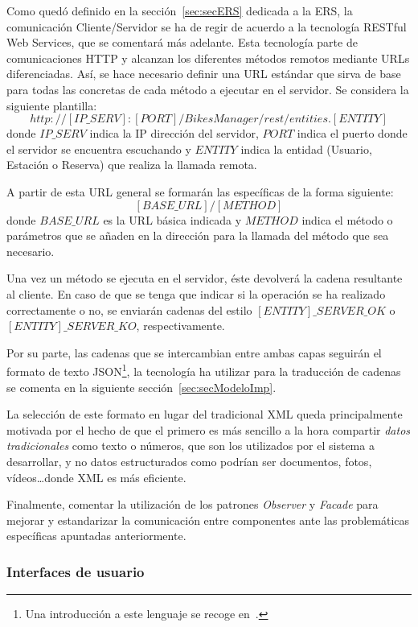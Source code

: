 Como quedó definido en la sección~\ref{sec:secERS} dedicada a la ERS, la comunicación Cliente/Servidor se ha de regir de acuerdo a la tecnología RESTful Web Services, que se comentará más adelante. Esta tecnología parte de comunicaciones HTTP y alcanzan los diferentes métodos remotos mediante URLs diferenciadas. Así, se hace necesario definir una URL estándar que sirva de base para todas las concretas de cada método a ejecutar en el servidor. Se considera la siguiente plantilla: $$http://[IP\_SERV]:[PORT]/BikesManager/rest/entities.[ENTITY]$$
donde $IP\_SERV$ indica la IP dirección del servidor, $PORT$ indica el puerto donde el servidor se encuentra escuchando y $ENTITY$ indica la entidad (Usuario, Estación o Reserva) que realiza la llamada remota.

A partir de esta URL general se formarán las específicas de la forma siguiente: $$[BASE\_URL]/[METHOD]$$
donde $BASE\_URL$ es la URL básica indicada y $METHOD$ indica el método o parámetros que se añaden en la dirección para la llamada del método que sea necesario.

Una vez un método se ejecuta en el servidor, éste devolverá la cadena resultante al cliente. En caso de que se tenga que indicar si la operación se ha realizado correctamente o no, se enviarán cadenas del estilo $[ENTITY]\_SERVER\_OK$ o $[ENTITY]\_SERVER\_KO$, respectivamente.

Por su parte, las cadenas que se intercambian entre ambas capas seguirán el formato de texto JSON\footnote{Una introducción a este lenguaje se recoge en~\cite{JSON}.}, la tecnología ha utilizar para la traducción de cadenas se comenta en la siguiente sección~\ref{sec:secModeloImp}.

La selección de este formato en lugar del tradicional XML queda principalmente motivada por el hecho de que el primero es más sencillo a la hora compartir \emph{datos tradicionales} como texto o números, que son los utilizados por el sistema a desarrollar, y no datos estructurados como podrían ser documentos, fotos, vídeos\dots donde XML es más eficiente.

Finalmente, comentar la utilización de los patrones \emph{Observer} y \emph{Facade} para mejorar y estandarizar la comunicación entre componentes ante las problemáticas específicas apuntadas anteriormente.

\subsubsection{Interfaces de usuario}

